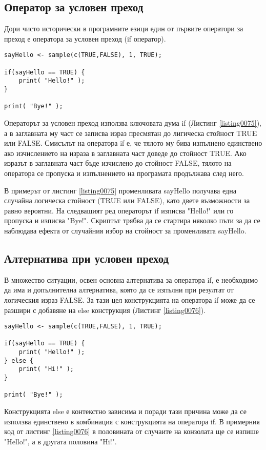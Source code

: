 \subsection{Оператор за условен преход}

Дори чисто исторически в програмните езици един от първите оператори за преход е оператора за условен преход (if оператор). 

\begin{lstlisting}[caption=Оператор за условен преход if, label=listing0075]
sayHello <- sample(c(TRUE,FALSE), 1, TRUE);

if(sayHello == TRUE) {
	print( "Hello!" );
}

print( "Bye!" );
\end{lstlisting}

Операторът за условен преход използва ключовата дума if (Листинг \ref{listing0075}), а в заглавната му част се записва израз пресмятан до лигическа стойност TRUE или FALSE. Смисълът на оператора if е, че тялото му бива изпълнено единствено ако изчислението на израза в заглавната част доведе до стойност TRUE. Ако изразът в заглавната част бъде изчислено до стойност FALSE, тялото на оператора се пропуска и изпълнението на програмата продължава след него.

В примерът от листинг \ref{listing0075} променливата sayHello получава една случайна логическа стойност (TRUE или FALSE), като двете възможности за равно вероятни. На следващият ред операторът if изписва "Hello!" или го пропуска и изписва "Bye!". Скриптът трябва да се стартира няколко пъти за да се наблюдава ефекта от случайния избор на стойност за променливата sayHello.

\subsection{Алтернатива при условен преход}

В множество ситуации, освен основна алтернатива за оператора if, е необходимо да има и допълнителна алтернатива, която да се изпълни при резултат от логическия израз FALSE. За тази цел конструкцията на оператора if може да се разшири с добавяне на else конструкция (Листинг \ref{listing0076}).

\begin{lstlisting}[caption=Оператор за условен преход if-else, label=listing0076]
sayHello <- sample(c(TRUE,FALSE), 1, TRUE);

if(sayHello == TRUE) {
	print( "Hello!" );
} else {
	print( "Hi!" );
}

print( "Bye!" );
\end{lstlisting}
Конструкцията else е контекстно зависима и поради тази причина може да се използва единствено в комбинация с конструкцията на оператора if. В примерния код от листинг \ref{listing0076} в половината от случаите на конзолата ще се изпише "Hello!", а в другата половина "Hi!".

